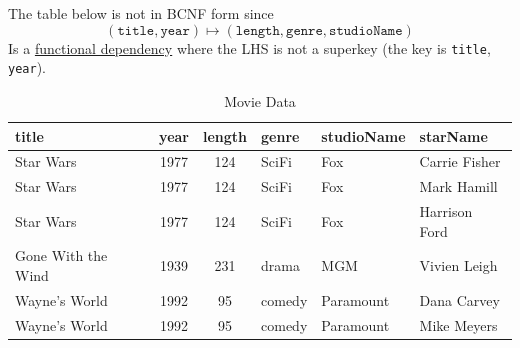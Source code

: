   \begin{example}
    \label{ex:non-bncf-form}
    The table below is not in BCNF form since 
    \begin{equation}
      (\texttt{title}, \texttt{year}) \mapsto (\texttt{length}, \texttt{genre}, \texttt{studioName}) 
    \end{equation}
    Is a \hyperref[def:functional-dependency]{functional dependency} where the LHS is not a superkey (the key is \texttt{title}, \texttt{year}). 
    \begin{table}[H]
      \centering
      \begin{tabular}{|l|c|c|l|l|l|}
      \hline
      \textbf{title} & \textbf{year} & \textbf{length} & \textbf{genre} & \textbf{studioName} & \textbf{starName} \\
      \hline
      Star Wars & 1977 & 124 & SciFi & Fox & Carrie Fisher \\
      Star Wars & 1977 & 124 & SciFi & Fox & Mark Hamill \\
      Star Wars & 1977 & 124 & SciFi & Fox & Harrison Ford \\
      Gone With the Wind & 1939 & 231 & drama & MGM & Vivien Leigh \\
      Wayne's World & 1992 & 95 & comedy & Paramount & Dana Carvey \\
      Wayne's World & 1992 & 95 & comedy & Paramount & Mike Meyers \\
      \hline
      \end{tabular}
      \caption{Movie Data}
      \label{tab:moviedata}
    \end{table} 
  \end{example}

